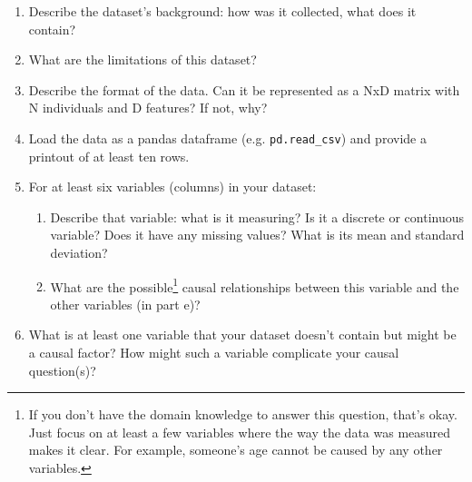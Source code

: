 \documentclass[12pt]{article}
\begin{document}
\begin{enumerate}[itemsep=0em,label={(\alph*)}]
\item Describe the dataset's background: how was it collected, what does it contain?
\item What are the limitations of this dataset? 
\item Describe the format of the data. Can it be represented as a NxD matrix with N individuals and D features? If not, why?
\item Load the data as a pandas dataframe (e.g. {\tt pd.read\_csv}) and provide a printout of at least ten rows.
\item For at least six variables (columns) in your dataset:
  \begin{enumerate}[itemsep=0em,label={\roman*.}]
     \item Describe that variable: what is it measuring? Is it a discrete or continuous variable? Does it have any missing values? What is its mean and standard deviation?
     \item What are the possible\footnote{If you don't have the domain knowledge to answer this question, that's okay. Just focus on at least a few variables where the way the data was measured makes it clear. For example, someone's age cannot be caused by any other variables.} causal relationships between this variable and the other variables (in part e)?
  \end{enumerate}
\item What is at least one variable that your dataset doesn't contain but might be a causal factor? How might such a variable complicate your causal question(s)?
\end{enumerate}
\end{document}
